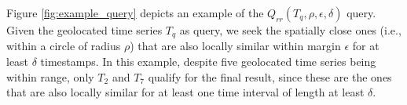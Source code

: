 \begin{myexample}
 Figure \ref{fig:example_query} depicts an example of the $Q_{rr}(T_q, \rho, \epsilon, \delta)$ query. Given the geolocated time series $T_q$ as query, we seek the spatially close ones (i.e., within a circle of radius $\rho$) that are also locally similar within margin $\epsilon$ for at least $\delta$ timestamps. In this example, despite five geolocated time series being within range, only $T_2$ and $T_7$ qualify for the final result, since these are the ones that are also locally similar for at least one time interval of length at least $\delta$.
\end{myexample}

